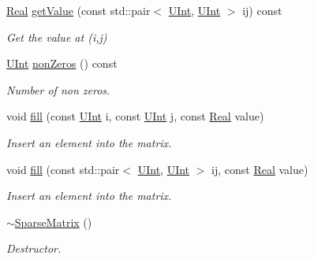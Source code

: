 \begin{DoxyCompactItemize}
\hyperlink{namespaceFVCode3D_a40c1f5588a248569d80aa5f867080e83}{Real} \hyperlink{classFVCode3D_1_1SparseMatrix_a57e71069d98acd9b52f0dfe4b7235647}{get\+Value} (const std\+::pair$<$ \hyperlink{namespaceFVCode3D_a4bf7e328c75d0fd504050d040ebe9eda}{U\+Int}, \hyperlink{namespaceFVCode3D_a4bf7e328c75d0fd504050d040ebe9eda}{U\+Int} $>$ ij) const 
\begin{DoxyCompactList}\small\item\em Get the value at (i,j) \end{DoxyCompactList}\item 
\hyperlink{namespaceFVCode3D_a4bf7e328c75d0fd504050d040ebe9eda}{U\+Int} \hyperlink{classFVCode3D_1_1SparseMatrix_a129abefb84ed2aa704d0fc45bcc62b59}{non\+Zeros} () const 
\begin{DoxyCompactList}\small\item\em Number of non zeros. \end{DoxyCompactList}\item 
void \hyperlink{classFVCode3D_1_1SparseMatrix_aa232dd2521469ec2b6f5e33332e1db63}{fill} (const \hyperlink{namespaceFVCode3D_a4bf7e328c75d0fd504050d040ebe9eda}{U\+Int} i, const \hyperlink{namespaceFVCode3D_a4bf7e328c75d0fd504050d040ebe9eda}{U\+Int} j, const \hyperlink{namespaceFVCode3D_a40c1f5588a248569d80aa5f867080e83}{Real} value)
\begin{DoxyCompactList}\small\item\em Insert an element into the matrix. \end{DoxyCompactList}\item 
void \hyperlink{classFVCode3D_1_1SparseMatrix_a378e604e4b74837d52f7a49bb7037023}{fill} (const std\+::pair$<$ \hyperlink{namespaceFVCode3D_a4bf7e328c75d0fd504050d040ebe9eda}{U\+Int}, \hyperlink{namespaceFVCode3D_a4bf7e328c75d0fd504050d040ebe9eda}{U\+Int} $>$ ij, const \hyperlink{namespaceFVCode3D_a40c1f5588a248569d80aa5f867080e83}{Real} value)
\begin{DoxyCompactList}\small\item\em Insert an element into the matrix. \end{DoxyCompactList}\item 
\hyperlink{classFVCode3D_1_1SparseMatrix_a58a40b119145886426ad68c51a0ef9fd}{$\sim$\+Sparse\+Matrix} ()
\begin{DoxyCompactList}\small\item\em Destructor. \end{DoxyCompactList}\end{DoxyCompactItemize}
